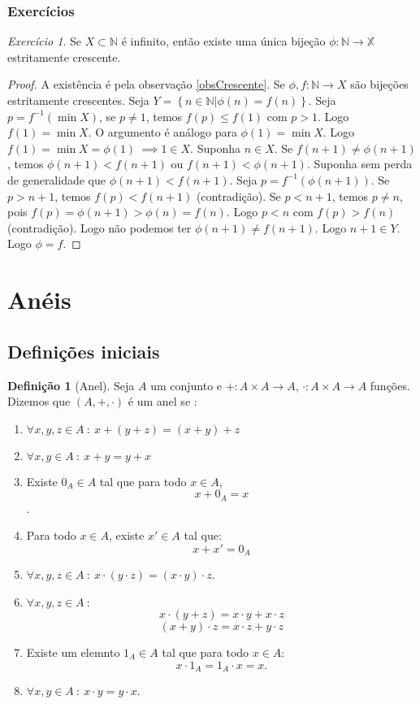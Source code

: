 \documentclass{article}
\theoremstyle{theorem}
\theoremstyle{lemma}
\theoremstyle{definition}
\newtheorem{definicao}{Definição}[section]
\theoremstyle{remark}
\newtheorem{exercicio}{Exercício}[subsection]
\begin{document}
\subsubsection{Exercícios}
\begin{exercicio}
	Se $X \subset \mathbb{N}$ é  infinito, então existe uma única bijeção $\phi: \mathbb{N} \to \mathbb{X}$ estritamente crescente.
\end{exercicio}
\begin{proof}
	A existência é pela observação \ref{obsCrescente}. Se $\phi,f:\mathbb{N} \to  X$ são bijeções estritamente crescentes. Seja $Y = \left\{n \in \mathbb{N} | \phi(n) = f(n)\right\}$. Seja $p = f^{-1}(\min X)$, se $p\neq 1$, temos $f(p) \leq f(1)$ com $p > 1$. Logo $f(1) = \min X$. O argumento é análogo para $\phi(1) = \min X$. Logo $f(1) = \min X = \phi(1)\ \implies 1 \in X$. Suponha $n\in X$. Se $f(n+1) \neq \phi(n+1)$, temos $\phi(n+1) < f(n+1)$ ou $f(n+1) < \phi(n+1)$. Suponha sem perda de generalidade que $\phi(n+1) < f(n+1)$. Seja $p = f^{-1}(\phi(n+1))$. Se $p > n+1$, temos $f(p) < f(n+1)$ (contradição). Se $p < n+1$, temos $p \neq n$, pois $f(p) = \phi(n+1) > \phi(n) = f(n)$. Logo $p < n$ com $f(p) > f(n)$ (contradição). Logo não podemos ter $\phi(n+1) \neq f(n+1)$. Logo $n+1\in Y$. Logo $\phi  = f$.
\end{proof}

\section{Anéis }

\subsection{Definições iniciais}
\begin{definicao}[Anel]
	Seja $A$ um conjunto e $+ : A\times A \to A$, $\cdot : A \times A \to A$ funções. Dizemos que $(A, +, \cdot) $ é um anel se :
	\begin{enumerate}
		\item  $ \forall x,y,z\in A \: : \:  x+ (y+z) = (x+y) + z $
		\item $ \forall x,y \in A \: : \:  x+ y = y+x $
		\item Existe $0_A \in A$ tal que para todo $x\in A$, $$x+0_A = x$$.
		\item Para todo $x\in A$, existe $x'\in A$ tal que:  $$ x + x' = 0_A$$
		\item  $ \forall x,y,z\in A \: : \:  x\cdot (y\cdot z) = (x\cdot y)\cdot z$.
		\item  $ \forall x,y,z\in A \: :$
			$$x\cdot (y+ z) = x\cdot y + x\cdot z$$
			$$ (x+ y) \cdot z = x\cdot z + y\cdot z$$
		\item  Existe um elemnto $1_A \in A$ tal que para todo $x\in A$: $$ x\cdot 1_A = 1_A\cdot x =  x.$$
		\item  $ \forall x,y\in A \: : \:  x\cdot y = y\cdot x$.
	\end{enumerate}
\end{definicao}
\end{document}

